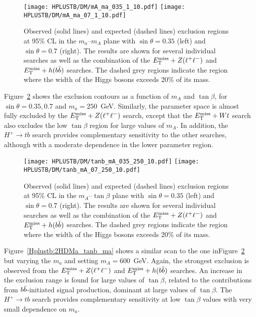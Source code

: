 \begin{figure}[htb]
    \RawFloats
    \centering
    \texttt{[image: HPLUSTB/DM/mA\_ma\_035\_1\_10.pdf]}
    \texttt{[image: HPLUSTB/DM/mA\_ma\_07\_1\_10.pdf]}
    \caption{Observed (solid lines) and expected (dashed lines) exclusion regions at 95\% CL in the $m_a$--$m_A$ plane with $\sin\theta=0.35$ (left) and $\sin\theta=0.7$ (right). The results are shown for several individual searches as well as the combination of the $E_{\text{T}}^{\text{miss}}+Z(\ell^+\ell^-)$ and $E_{\text{T}}^{\text{miss}}+h(b\bar{b})$ searches. The dashed grey regions indicate the region where the width of the Higgs bosons exceeds 20\% of its mass.}
    \label{Hplustb:2HDMa_mA_ma}
\end{figure}

Figure~\ref{Hplustb:2HDMa_tanb_mA} shows the exclusion contours as a function of $m_A$ and $\tan\beta$, for $\sin\theta=0.35,0.7$ and $m_a=250$~GeV. Similarly, the parameter space is almost fully excluded by the $E_{\text{T}}^{\text{miss}}+ Z(\ell^+\ell^-)$ search, except that the $E_{\text{T}}^{\text{miss}}+ Wt$ search also excludes the low $\tan\beta$ region for large values of $m_A$. In addition, the $H^+\to tb$ search provides complementary sensitivity to the other searches, although with a moderate dependence in the lower parameter region.\\

\begin{figure}[htb]
    \RawFloats
    \centering
    \texttt{[image: HPLUSTB/DM/tanb\_mA\_035\_250\_10.pdf]}
    \texttt{[image: HPLUSTB/DM/tanb\_mA\_07\_250\_10.pdf]}
    \caption{Observed (solid lines) and expected (dashed lines) exclusion regions at 95\% CL in the $m_A$--$\tan\beta$ plane with $\sin\theta=0.35$ (left) and $\sin\theta=0.7$ (right). The results are shown for several individual searches as well as the combination of the $E_{\text{T}}^{\text{miss}}+Z(\ell^+\ell^-)$ and $E_{\text{T}}^{\text{miss}}+h(b\bar{b})$ searches. The dashed grey regions indicate the region where the width of the Higgs bosons exceeds 20\% of its mass.}
    \label{Hplustb:2HDMa_tanb_mA}
\end{figure}

Figure~\ref{Hplustb:2HDMa_tanb_ma} shows a similar scan to the one inFigure~\ref{Hplustb:2HDMa_tanb_mA} but varying the $m_a$ and setting $m_A=600$~GeV. Again, the strongest exclusion is observed from the $E_{\text{T}}^{\text{miss}}+ Z(\ell^+\ell^-)$ and $E_{\text{T}}^{\text{miss}}+ h(b\bar{b})$ searches. An increase in the exclusion range is found for large values of $\tan\beta$, related to the contributions from $b\bar{b}$-initiated signal production, dominant at large values of $\tan\beta$. The $H^+\to tb$ search provides complementary sensitivity at low $\tan\beta$ values with very small dependence on $m_a$.\\

